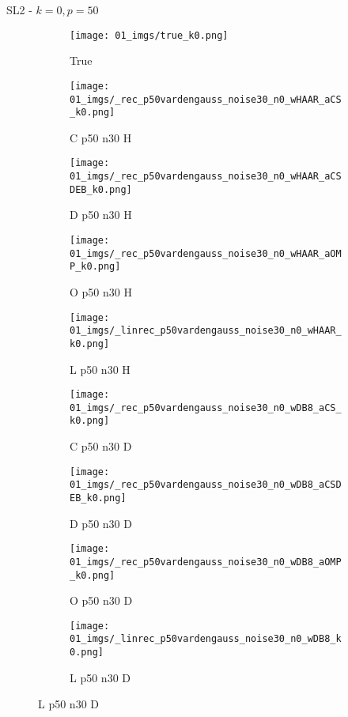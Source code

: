 \begin{frame}{SL2 - $k=0,p=50$}{}
\begin{figure}
\begin{subfigure}{0.1\textwidth}
\texttt{[image: 01\_imgs/true\_k0.png]}
\caption*{\Tiny True}
\end{subfigure}
\begin{subfigure}{0.1\textwidth}
\texttt{[image: 01\_imgs/\_rec\_p50vardengauss\_noise30\_n0\_wHAAR\_aCS\_k0.png]}
\caption*{\Tiny C p50 n30 H}
\end{subfigure}
\begin{subfigure}{0.1\textwidth}
\texttt{[image: 01\_imgs/\_rec\_p50vardengauss\_noise30\_n0\_wHAAR\_aCSDEB\_k0.png]}
\caption*{\Tiny D p50 n30 H}
\end{subfigure}
\begin{subfigure}{0.1\textwidth}
\texttt{[image: 01\_imgs/\_rec\_p50vardengauss\_noise30\_n0\_wHAAR\_aOMP\_k0.png]}
\caption*{\Tiny O p50 n30 H}
\end{subfigure}
\begin{subfigure}{0.1\textwidth}
\texttt{[image: 01\_imgs/\_linrec\_p50vardengauss\_noise30\_n0\_wHAAR\_k0.png]}
\caption*{\Tiny L p50 n30 H}
\end{subfigure}
\begin{subfigure}{0.1\textwidth}
\texttt{[image: 01\_imgs/\_rec\_p50vardengauss\_noise30\_n0\_wDB8\_aCS\_k0.png]}
\caption*{\Tiny C p50 n30 D}
\end{subfigure}
\begin{subfigure}{0.1\textwidth}
\texttt{[image: 01\_imgs/\_rec\_p50vardengauss\_noise30\_n0\_wDB8\_aCSDEB\_k0.png]}
\caption*{\Tiny D p50 n30 D}
\end{subfigure}
\begin{subfigure}{0.1\textwidth}
\texttt{[image: 01\_imgs/\_rec\_p50vardengauss\_noise30\_n0\_wDB8\_aOMP\_k0.png]}
\caption*{\Tiny O p50 n30 D}
\end{subfigure}
\begin{subfigure}{0.1\textwidth}
\texttt{[image: 01\_imgs/\_linrec\_p50vardengauss\_noise30\_n0\_wDB8\_k0.png]}
\caption*{\Tiny L p50 n30 D}
\end{subfigure}
\end{figure}
\end{frame}


